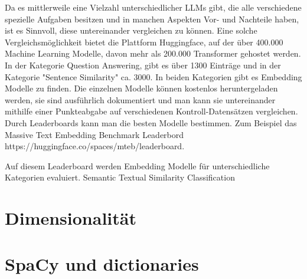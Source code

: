 Da es mittlerweile eine Vielzahl unterschiedlicher LLMs gibt, die alle verschiedene spezielle Aufgaben besitzen und in manchen Aspekten Vor- und Nachteile haben, ist es Sinnvoll, diese untereinander vergleichen zu können.
Eine solche Vergleichsmöglichkeit bietet die Plattform Huggingface, auf der über 400.000 Machine Learning Modelle, davon mehr als 200.000 Transformer gehostet werden.
In der Kategorie Question Answering, gibt es über 1300 Einträge und in der Kategorie "Sentence Similarity" ca. 3000.
In beiden Kategorien gibt es Embedding Modelle zu finden.
Die einzelnen Modelle können  kostenlos heruntergeladen werden, sie sind ausführlich dokumentiert und man kann sie untereinander mithilfe einer Punkteabgabe auf verschiedenen Kontroll-Datensätzen vergleichen.
Durch Leaderboards kann man die besten Modelle bestimmen.
Zum Beispiel das Massive Text Embedding Benchmark Leaderbord https://huggingface.co/spaces/mteb/leaderboard.\cite{muennighoff2023}

Auf diesem Leaderboard werden Embedding Modelle für unterschiedliche Kategorien evaluiert.
Semantic Textual Similarity 
Classification






\section{Dimensionalität}

\section{SpaCy und dictionaries}
